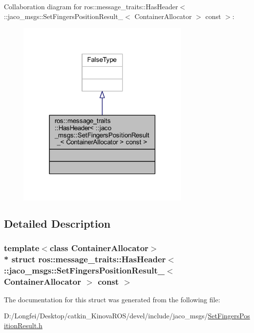 Collaboration diagram for ros\+:\+:message\+\_\+traits\+:\+:Has\+Header$<$ \+:\+:jaco\+\_\+msgs\+:\+:Set\+Fingers\+Position\+Result\+\_\+$<$ Container\+Allocator $>$ const $>$\+:
\nopagebreak
\begin{figure}[H]
\begin{center}
\leavevmode
\includegraphics[width=242pt]{d6/dde/structros_1_1message__traits_1_1HasHeader_3_01_1_1jaco__msgs_1_1SetFingersPositionResult___3_01Ca9e5e55492944a2952c0907c138c6002}
\end{center}
\end{figure}


\subsection{Detailed Description}
\subsubsection*{template$<$class Container\+Allocator$>$\\*
struct ros\+::message\+\_\+traits\+::\+Has\+Header$<$ \+::jaco\+\_\+msgs\+::\+Set\+Fingers\+Position\+Result\+\_\+$<$ Container\+Allocator $>$ const  $>$}



The documentation for this struct was generated from the following file\+:\begin{DoxyCompactItemize}
\item 
D\+:/\+Longfei/\+Desktop/catkin\+\_\+\+Kinova\+R\+O\+S/devel/include/jaco\+\_\+msgs/\hyperlink{SetFingersPositionResult_8h}{Set\+Fingers\+Position\+Result.\+h}\end{DoxyCompactItemize}
